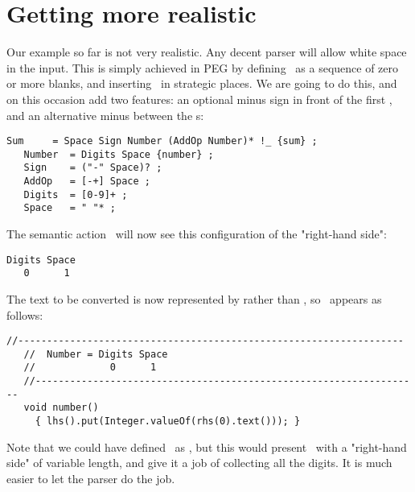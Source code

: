 \newpage

\section{Getting more realistic}


Our example so far is not very realistic.
Any decent parser will allow white space in the input.
This is simply achieved in PEG by defining \Space\
as a sequence of zero or more blanks,
and inserting \Space\ in strategic places.
We are going to do this, and on this occasion add two features:
an optional minus sign in front of the first \Number,
and an alternative minus between the \Number s:

\small
\begin{Verbatim}[frame=single,framesep=2mm,samepage=true,xleftmargin=15mm,xrightmargin=15mm,baselinestretch=0.8]
   Sum     = Space Sign Number (AddOp Number)* !_ {sum} ;
   Number  = Digits Space {number} ; 
   Sign    = ("-" Space)? ;
   AddOp   = [-+] Space ;
   Digits  = [0-9]+ ;
   Space   = " "* ;
\end{Verbatim}
\normalsize

The semantic action \Numbera\ will now see this configuration
of the "right-hand side":

\small
\begin{Verbatim}[samepage=true,xleftmargin=15mm,baselinestretch=0.9]
 Digits Space
   0      1
\end{Verbatim}
\normalsize

The text to be converted is now represented by  rather than ,
so \Numbera\ appears as follows:

\small
\begin{Verbatim}[frame=single,framesep=2mm,samepage=true,xleftmargin=15mm,xrightmargin=15mm,baselinestretch=0.8]
   //-------------------------------------------------------------------
   //  Number = Digits Space
   //             0      1
   //-------------------------------------------------------------------
   void number()
     { lhs().put(Integer.valueOf(rhs(0).text())); }
\end{Verbatim}
\normalsize

Note that we could have defined \Number\ as ,
but this would present \Numbera\ with a "right-hand side" of variable length,
and give it a job of collecting all the digits.
It is much easier to let the parser do the job.

